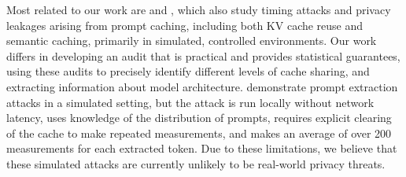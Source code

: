 Most related to our work are \citet{song2024early} and \citet{zheng2024inputsnatch}, which also study timing attacks and privacy leakages arising from prompt caching, including both KV cache reuse and semantic caching, primarily in simulated, controlled environments. Our work differs in developing an audit that is practical and provides statistical guarantees, using these audits to precisely identify different levels of cache sharing, and extracting information about model architecture. \citet{song2024early} demonstrate prompt extraction attacks in a simulated setting, but the attack is run locally without network latency, uses knowledge of the distribution of prompts, requires explicit clearing of the cache to make repeated measurements, and makes an average of over 200 measurements for each extracted token. Due to these limitations, we believe that these simulated attacks are currently unlikely to be real-world privacy threats.

